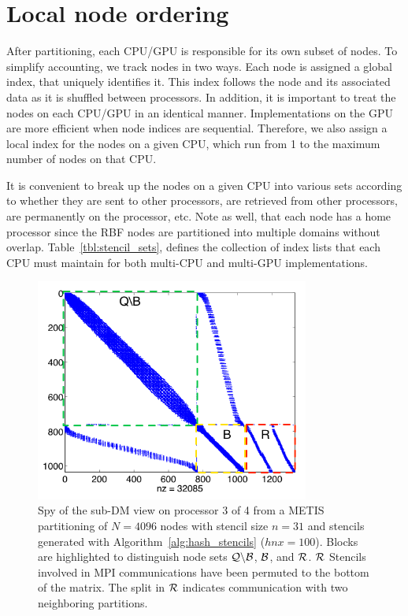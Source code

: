 \documentclass{report}
\begin{document}
\section{Local node ordering}

After partitioning, each CPU/GPU is responsible for its own subset of nodes. 
To simplify accounting, we track nodes in two ways. Each node is assigned
a global index, that uniquely identifies it. This index follows the node 
and its associated data as it is shuffled between processors. In addition, 
it is important to treat the nodes on each CPU/GPU in an identical manner. 
Implementations on the GPU are more efficient when node indices
are sequential. Therefore, we also assign a local index for the nodes on 
a given CPU, which run from 1 to the maximum number of nodes on that CPU. 

It is convenient to break up the nodes on a given CPU into various sets
according to whether they are sent to other processors, are retrieved from 
other processors, are permanently on the processor, etc. Note as well, 
that each node has a home processor since the RBF nodes are partitioned into 
multiple domains without overlap.
Table~\ref{tbl:stencil_sets}, defines the collection of index lists that each CPU must maintain for both multi-CPU and multi-GPU implementations.  


\begin{figure}[ht!]
\begin{center}
\includegraphics[width=9cm]{rbffd_methods_content/decompositions/spy_metis_stencil_example_labels.png}
\caption{Spy of the sub-DM view on processor 3 of 4 from a METIS partitioning of $N=4096$ nodes with stencil size $n=31$ and stencils generated with Algorithm~\ref{alg:hash_stencils} ($hnx=100$). Blocks are highlighted to distinguish node sets $\mathcal{Q} \backslash \mathcal{B}$, $\mathcal{B}$, and $\mathcal{R}$. $\mathcal{R}$ Stencils involved in MPI communications have been permuted to the bottom of the matrix. The split in $\mathcal{R}$ indicates communication with two neighboring partitions. }
\label{fig:decomp_spy}
\end{center}
\end{figure}
\end{document}
